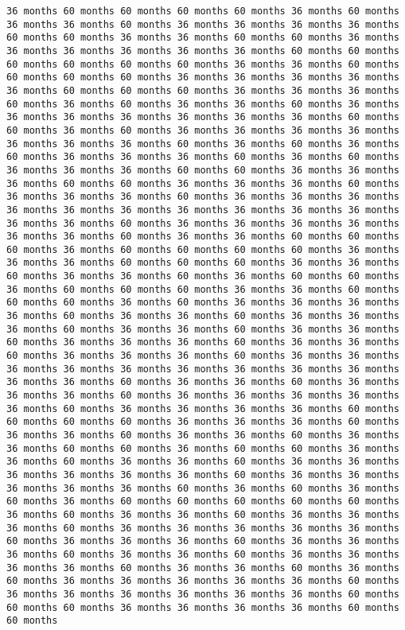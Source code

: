 \documentclass[11pt]{article}
\begin{document}
\begin{Verbatim}[commandchars=\\\{\}, frame=single, framerule=2mm, rulecolor=\color{outerrorbackground}]
36 months 60 months 60 months 60 months 60 months 36 months 60 months 36 months 36 months 60 months 36 months 36 months 36 months 36 months 60 months 60 months 36 months 36 months 60 months 60 months 36 months 36 months 36 months 36 months 36 months 36 months 60 months 60 months 60 months 60 months 60 months 60 months 36 months 36 months 60 months 60 months 60 months 60 months 36 months 36 months 36 months 36 months 36 months 60 months 60 months 60 months 36 months 36 months 36 months 60 months 36 months 60 months 36 months 36 months 60 months 36 months 36 months 36 months 36 months 36 months 36 months 36 months 60 months 60 months 36 months 60 months 36 months 36 months 36 months 36 months 36 months 36 months 36 months 60 months 36 months 60 months 36 months 60 months 36 months 36 months 36 months 60 months 36 months 60 months 36 months 36 months 36 months 60 months 60 months 36 months 36 months 36 months 60 months 60 months 36 months 36 months 36 months 60 months 36 months 36 months 36 months 60 months 36 months 36 months 36 months 36 months 36 months 36 months 36 months 36 months 36 months 36 months 36 months 36 months 60 months 36 months 36 months 36 months 36 months 36 months 36 months 60 months 36 months 36 months 60 months 60 months 60 months 36 months 60 months 60 months 60 months 60 months 36 months 36 months 36 months 60 months 60 months 60 months 36 months 36 months 60 months 36 months 36 months 60 months 36 months 60 months 60 months 36 months 60 months 60 months 60 months 36 months 36 months 60 months 60 months 60 months 36 months 60 months 36 months 36 months 36 months 36 months 60 months 36 months 36 months 60 months 36 months 36 months 36 months 60 months 36 months 36 months 60 months 36 months 36 months 60 months 36 months 36 months 36 months 60 months 36 months 36 months 60 months 36 months 36 months 36 months 60 months 36 months 36 months 36 months 36 months 36 months 36 months 36 months 36 months 36 months 36 months 36 months 60 months 36 months 36 months 60 months 36 months 36 months 36 months 60 months 36 months 36 months 36 months 36 months 36 months 60 months 36 months 36 months 36 months 36 months 60 months 60 months 60 months 60 months 36 months 36 months 36 months 60 months 36 months 36 months 60 months 36 months 36 months 60 months 36 months 36 months 60 months 60 months 36 months 60 months 60 months 36 months 36 months 60 months 36 months 36 months 60 months 36 months 36 months 36 months 36 months 36 months 36 months 60 months 36 months 36 months 36 months 36 months 36 months 60 months 36 months 60 months 36 months 60 months 36 months 60 months 60 months 60 months 60 months 60 months 36 months 60 months 36 months 36 months 60 months 36 months 36 months 36 months 60 months 36 months 36 months 36 months 36 months 36 months 60 months 36 months 36 months 36 months 60 months 36 months 36 months 36 months 60 months 36 months 36 months 60 months 36 months 36 months 36 months 36 months 60 months 36 months 36 months 60 months 36 months 60 months 36 months 36 months 36 months 36 months 36 months 60 months 36 months 36 months 36 months 36 months 36 months 36 months 60 months 60 months 60 months 36 months 36 months 36 months 36 months 60 months 60 months 
\end{Verbatim}
\end{document}
